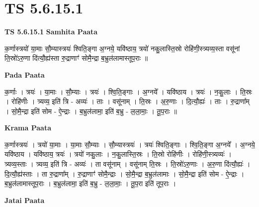 \documentclass[17pt]{extarticle}
\begin{document}
\section{ TS 5.6.15.1 }

\textbf{TS 5.6.15.1 } \newline
\textbf{Samhita Paata} \newline

क॒र्णास्त्रयो॑ या॒माः सौ॒म्यास्त्रयः॑ श्विति॒ङ्गा अ॒ग्नये॒ यवि॑ष्ठाय॒ त्रयो॑ नकु॒लास्ति॒स्रो रोहि॑णी॒स्त्र्यव्य॒स्ता वसू॑नां ति॒स्रो॑ऽरु॒णा दि॑त्यौ॒ह्य॑स्ता रु॒द्राणाꣳ॑ सोमै॒न्द्रा ब॒भ्रुल॑लामास्तूप॒राः ॥ \newline

\textbf{Pada Paata} \newline

क॒र्णाः । त्रयः॑ । या॒माः । सौ॒म्याः । त्रयः॑ । श्वि॒ति॒ङ्गाः । अ॒ग्नये᳚ । यवि॑ष्ठाय । त्रयः॑ । न॒कु॒लाः । ति॒स्रः । रोहि॑णीः । त्र्यव्य॒ इति॑ त्रि - अव्यः॑ । ताः । वसू॑नाम् । ति॒स्रः । अ॒रु॒णाः । दि॒त्यौ॒ह्यः॑ । ताः । रु॒द्राणा᳚म् । सो॒मै॒न्द्रा इति॑ सोम - ऐ॒न्द्राः । ब॒भ्रुल॑लामा॒ इति॑ ब॒भ्रु - ल॒ला॒माः॒ । तू॒प॒राः ॥  \newline


\textbf{Krama Paata} \newline

क॒र्णास्त्रयः॑ । त्रयो॑ या॒माः । या॒माः सौ॒म्याः । सौ॒म्यास्त्रयः॑ । त्रयः॑ श्विति॒ङ्गाः । श्वि॒ति॒ङ्गा अ॒ग्नये᳚ । अ॒ग्नये॒ यवि॑ष्ठाय । यवि॑ष्ठाय॒ त्रयः॑ । त्रयो॑ नकु॒लाः । न॒कु॒लास्ति॒स्रः । ति॒स्रो रोहि॑णीः । रोहि॑णी॒स्त्र्यव्यः॑ । त्र्यव्य॒स्ताः । त्र्यव्य॒ इति॑ त्रि - अव्यः॑ । ता वसू॑नाम् । वसू॑नाम् ति॒स्रः । ति॒स्रो॑ऽरु॒णाः । अ॒रु॒णा दि॑त्यौ॒ह्यः॑ । दि॒त्यौ॒ह्य॑स्ताः । ता रु॒द्राणा᳚म् । रु॒द्राणाꣳ॑ सोमै॒न्द्राः । सो॒मै॒न्द्रा ब॒भ्रुल॑लामाः । सो॒मै॒न्द्रा इति॑ सोम - ऐ॒न्द्राः । ब॒भ्रुल॑लामास्तूप॒राः । ब॒भ्रुल॑लामा॒ इति॑ ब॒भ्रु - ल॒ला॒माः॒ । तू॒प॒रा इति॑ तूप॒राः । \newline

\textbf{Jatai Paata} \newline
\end{document}
